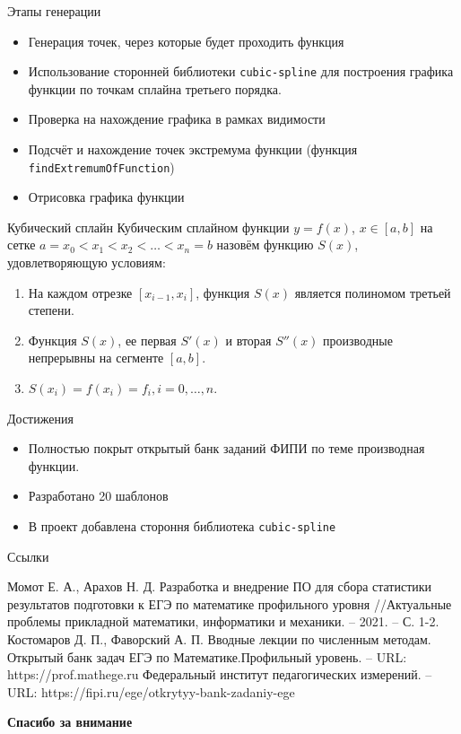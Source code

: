 \documentclass[aspectratio=169]{beamer}
\begin{document}
\begin{frame}{Этапы генерации}
    \begin{itemize}
        \item Генерация точек, через которые будет проходить функция
        \item Использование сторонней библиотеки \texttt{cubic-spline} для построения графика функции по точкам сплайна третьего порядка.
        \item Проверка на нахождение графика в рамках видимости %
        \item Подсчёт и нахождение точек экстремума функции (функция \texttt{findExtremumOfFunction})
        \item Отрисовка графика функции
    \end{itemize}
    
\end{frame}

\begin{frame}{Кубический сплайн}
    Кубическим сплайном функции $y = f (x)$, $x\in[a, b]$ на сетке $a=x_0<x_1<x_2< \dots <x_n=b$ назовём функцию $S (x)$, удовлетворяющую условиям:
    \begin{enumerate}
        \item На каждом отрезке $[x_{i-1},x_i]$, функция $S (x)$ является полиномом третьей степени.
        \item Функция $S (x)$, ее первая $S' (x)$ и вторая $S'' (x)$ производные непрерывны на сегменте $[a, b]$.
        \item $S (x_i)=f (x_i)=f_i, i=0,\dots,n$.
\end{enumerate}
\end{frame}   

\begin{frame}{Достижения}
    \begin{itemize}
        \item Полностью покрыт открытый банк заданий ФИПИ по теме производная функции.
        \item Разработано 20 шаблонов
        \item В проект добавлена стороння библиотека \texttt{cubic-spline}
    \end{itemize}
    
\end{frame}

\begin{frame}{Ссылки}
    \begin{thebibliography}{10}
         Момот Е. А., Арахов Н. Д. Разработка и внедрение ПО для сбора статистики результатов подготовки к ЕГЭ по математике профильного уровня //Актуальные проблемы прикладной математики, информатики и механики. – 2021. – С. 1-2.
        Костомаров Д. П., Фаворский А. П. Вводные лекции по численным методам.
        Открытый банк задач ЕГЭ по Математике.Профильный уровень. – URL:  https://prof.mathege.ru
        Федеральный институт педагогических измерений. – URL:  https://fipi.ru/ege/otkrytyy-bank-zadaniy-ege
        
    \end{thebibliography}
\end{frame}

\begin{frame}
    \center\Large\textcolor{NordBrightBlue}{\textbf{Спасибо за внимание}}\\
\end{frame}
\end{document}

